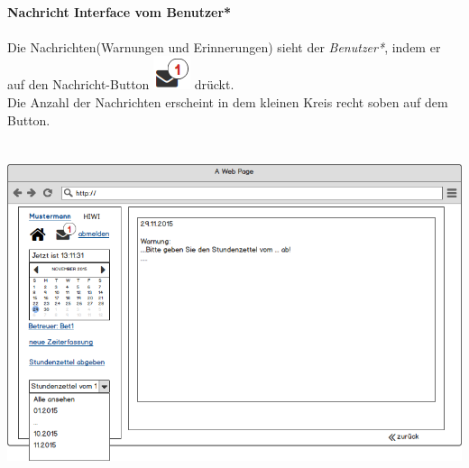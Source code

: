 \newpage
\textbf{\\Nachricht Interface vom Benutzer*}\\
\\
Die Nachrichten(Warnungen und Erinnerungen) sieht der \emph{Benutzer*}, indem er auf den Nachricht-Button
\includegraphics[scale=.8]{UI/Button/Nachricht.png} drückt.\\
Die Anzahl der Nachrichten erscheint in dem kleinen Kreis recht soben auf dem Button.\\
\\
\\
\includegraphics[width=\linewidth]{UI/Benutzer/Nachricht.png}

\newpage
